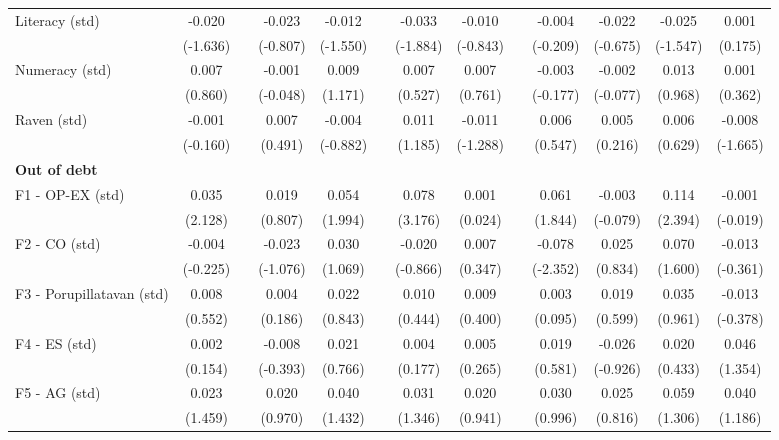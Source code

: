\begin{table}[htbp]
{\begin{tabular}{lcccccccccccc}
    Literacy (std) & -0.020 &   & -0.023 & -0.012 &   & -0.033 & -0.010 &   & -0.004 & -0.022 & -0.025 & 0.001 \\
      & (-1.636) &   & (-0.807) & (-1.550) &   & (-1.884) & (-0.843) &   & (-0.209) & (-0.675) & (-1.547) & (0.175) \\
    Numeracy (std) & 0.007 &   & -0.001 & 0.009 &   & 0.007 & 0.007 &   & -0.003 & -0.002 & 0.013 & 0.001 \\
      & (0.860) &   & (-0.048) & (1.171) &   & (0.527) & (0.761) &   & (-0.177) & (-0.077) & (0.968) & (0.362) \\
    Raven (std) & -0.001 &   & 0.007 & -0.004 &   & 0.011 & -0.011 &   & 0.006 & 0.005 & 0.006 & -0.008 \\
      & (-0.160) &   & (0.491) & (-0.882) &   & (1.185) & (-1.288) &   & (0.547) & (0.216) & (0.629) & (-1.665) \\
    \midrule
    \textbf{Out of debt} &       &       &       &       &       &       &       &       &       &       &       &  \\
    F1 - OP-EX (std) & 0.035 &   & 0.019 & 0.054 &   & 0.078 & 0.001 &   & 0.061 & -0.003 & 0.114 & -0.001 \\
      & (2.128) &   & (0.807) & (1.994) &   & (3.176) & (0.024) &   & (1.844) & (-0.079) & (2.394) & (-0.019) \\
    F2 - CO (std) & -0.004 &   & -0.023 & 0.030 &   & -0.020 & 0.007 &   & -0.078 & 0.025 & 0.070 & -0.013 \\
      & (-0.225) &   & (-1.076) & (1.069) &   & (-0.866) & (0.347) &   & (-2.352) & (0.834) & (1.600) & (-0.361) \\
    F3 - Porupillatavan (std) & 0.008 &   & 0.004 & 0.022 &   & 0.010 & 0.009 &   & 0.003 & 0.019 & 0.035 & -0.013 \\
      & (0.552) &   & (0.186) & (0.843) &   & (0.444) & (0.400) &   & (0.095) & (0.599) & (0.961) & (-0.378) \\
    F4 - ES (std) & 0.002 &   & -0.008 & 0.021 &   & 0.004 & 0.005 &   & 0.019 & -0.026 & 0.020 & 0.046 \\
      & (0.154) &   & (-0.393) & (0.766) &   & (0.177) & (0.265) &   & (0.581) & (-0.926) & (0.433) & (1.354) \\
    F5 - AG (std) & 0.023 &   & 0.020 & 0.040 &   & 0.031 & 0.020 &   & 0.030 & 0.025 & 0.059 & 0.040 \\
      & (1.459) &   & (0.970) & (1.432) &   & (1.346) & (0.941) &   & (0.996) & (0.816) & (1.306) & (1.186) \\

\end{tabular}}
\end{table}
